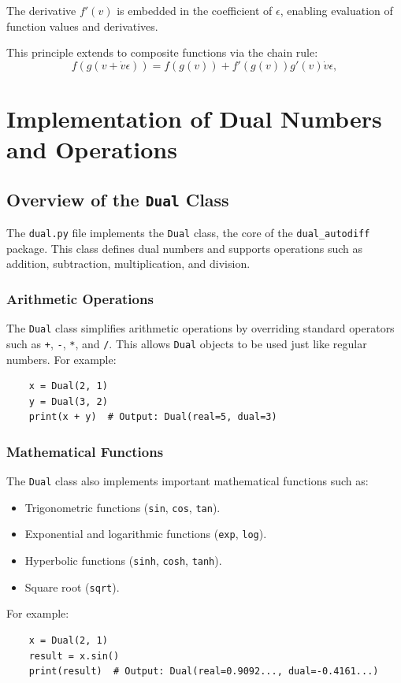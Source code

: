 \documentclass[a4paper,12pt]{article}
\begin{document}
The derivative \(f'(v)\) is embedded in the coefficient of \(\epsilon\), enabling evaluation of function values and derivatives.

This principle extends to composite functions via the chain rule:
\begin{equation}
    f(g(v + \dot{v}\epsilon)) = f(g(v)) + f'(g(v))g'(v)\dot{v}\epsilon,
    \label{eq:composite_function}
    \end{equation}
    

    \section{Implementation of Dual Numbers and Operations}

    \subsection{Overview of the \texttt{Dual} Class}
    The \texttt{dual.py} file implements the \texttt{Dual} class, the core of the \texttt{dual\_autodiff} package. This class defines dual numbers and supports operations such as addition, subtraction, multiplication, and division.
    
    \subsubsection{Arithmetic Operations}
    The \texttt{Dual} class simplifies arithmetic operations by overriding standard operators such as \texttt{+}, \texttt{-}, \texttt{*}, and \texttt{/}. This allows \texttt{Dual} objects to be used just like regular numbers. For example:
    \begin{verbatim}
    x = Dual(2, 1)
    y = Dual(3, 2)
    print(x + y)  # Output: Dual(real=5, dual=3)
    \end{verbatim}
    
    \subsubsection{Mathematical Functions}
    The \texttt{Dual} class also implements important mathematical functions such as:
    \begin{itemize}
        \item Trigonometric functions (\texttt{sin}, \texttt{cos}, \texttt{tan}).
        \item Exponential and logarithmic functions (\texttt{exp}, \texttt{log}).
        \item Hyperbolic functions (\texttt{sinh}, \texttt{cosh}, \texttt{tanh}).
        \item Square root (\texttt{sqrt}).
    \end{itemize}
    For example:
    \begin{verbatim}
    x = Dual(2, 1)
    result = x.sin()
    print(result)  # Output: Dual(real=0.9092..., dual=-0.4161...)
    \end{verbatim}
    
\end{document}
